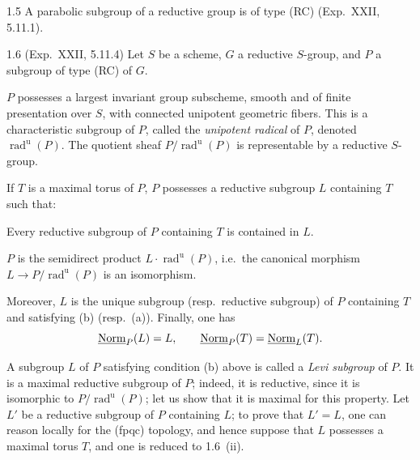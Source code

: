 \begin{corollary}{1.5}\label{XXVI.1.5}
A parabolic subgroup of a reductive group is of type (RC) (Exp.~XXII, 5.11.1).
\end{corollary}
\begin{proposition}{1.6 (Exp.~XXII, 5.11.4)}\label{XXVI.1.6}
Let $S$ be a scheme, $G$ a reductive $S$-group, and $P$ a subgroup of type (RC) of $G$.
\begin{enumeratei}
\item $P$ possesses a largest invariant group subscheme, smooth and of finite presentation over $S$, with connected unipotent geometric fibers. This is a characteristic subgroup of $P$, called the \emph{unipotent radical} of $P$, denoted $\operatorname{rad}^{\mathrm u}(P)$. The quotient sheaf $P/\operatorname{rad}^{\mathrm u}(P)$ is representable by a reductive $S$-group.
\item If $T$ is a maximal torus of $P$, $P$ possesses a reductive subgroup $L$ containing $T$ such that:
\begin{enumeratea}
\item Every reductive subgroup of $P$ containing $T$ is contained in $L$.
\item $P$ is the semidirect product $L\cdot\operatorname{rad}^{\mathrm u}(P)$, i.e.~the canonical morphism $L\to P/\operatorname{rad}^{\mathrm u}(P)$ is an isomorphism.
\end{enumeratea}
\end{enumeratei}
Moreover, $L$ is the unique subgroup (resp.~reductive subgroup) of $P$ containing $T$ and satisfying (b) (resp.~(a)). Finally, one has
\[
\underline{\mathrm{Norm}}_P(L)=L,\qquad\underline{\mathrm{Norm}}_P(T)=\underline{\mathrm{Norm}}_L(T).
\]
\end{proposition}

\label{XXVI.1.7}
A subgroup $L$ of $P$ satisfying condition (b) above is called a \emph{Levi subgroup} of $P$. It is a maximal reductive subgroup of $P$; indeed, it is reductive, since it is isomorphic to $P/\operatorname{rad}^{\mathrm u}(P)$; let us show that it is maximal for this property. Let $L'$ be a reductive subgroup of $P$ containing $L$; to prove that $L'=L$, one can reason locally for the (fpqc) topology, and hence suppose that $L$ possesses a maximal torus $T$, and one is reduced to 1.6~(ii).

